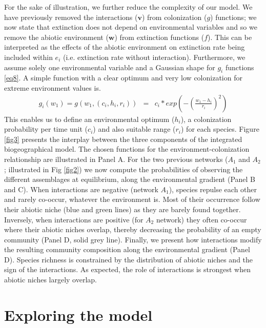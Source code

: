 For the sake of illustration, we further reduce the complexity of our model. We have previously removed the interactions ($\mathbf{v}$) from colonization ($g$) functions; we now state that extinction does not depend on environmental variables and so we remove the abiotic environment ($\mathbf{w}$) from extinction functions ($f$). This can be interpreted as the effects of the abiotic environment on extinction rate being included within $e_i$ (i.e. extinction rate without interaction). Furthermore, we assume solely one environmental variable and a Gaussian shape for $g_i$ functions \eqref{eq8}. A simple function with a clear optimum and very low colonization for extreme environment values is.
\begin{eqnarray}
\label{eq8} g_i(w_1)=g(w_1,(c_i,h_i,r_i))&=&c_i*exp\left(- \left( \frac{w_1-h_i}{r_i} \right) ^2\right)
\end{eqnarray}
This enables us to define an environmental optimum ($h_i$), a colonization probability per time unit ($c_i$) and also suitable range ($r_i$) for each species. Figure \ref{fig3} presents the interplay between the three components of the integrated biogeographical model. The chosen functions for the environment-colonization relationship are illustrated in Panel A. For the two previous networks ($A_1$ and $ A_2$; illustrated in Fig \ref{fig2}) we now compute the probabilities of observing the different assemblages at equilibrium, along the environmental gradient (Panel B and C). When interactions are negative (network $A_1$), species repulse each other and rarely co-occur, whatever the environment is. Most of their occurrence follow their abiotic niche (blue and green lines) as they are barely found together. Inversely, when interactions are positive (for $A_2$ network) they often co-occur where their abiotic niches overlap, thereby decreasing the probability of an empty community (Panel D, solid grey line). Finally, we present how interactions modify the resulting community composition along the environmental gradient (Panel D). Species richness is constrained by the distribution of abiotic niches and the sign of the interactions. As expected, the role of interactions is strongest when abiotic niches largely overlap.


\section{Exploring the model}

